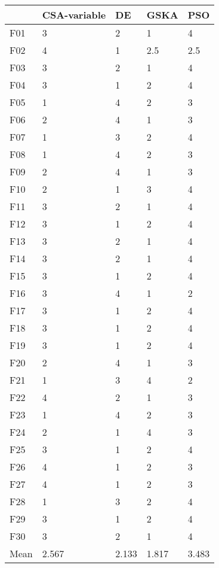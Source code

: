 \begin{tabular}{lllll}
\toprule
{} & CSA-variable &     DE &   GSKA &    PSO \\
\midrule
F01  &            3 &      2 &      1 &      4 \\
F02  &            4 &      1 &    2.5 &    2.5 \\
F03  &            3 &      2 &      1 &      4 \\
F04  &            3 &      1 &      2 &      4 \\
F05  &            1 &      4 &      2 &      3 \\
F06  &            2 &      4 &      1 &      3 \\
F07  &            1 &      3 &      2 &      4 \\
F08  &            1 &      4 &      2 &      3 \\
F09  &            2 &      4 &      1 &      3 \\
F10  &            2 &      1 &      3 &      4 \\
F11  &            3 &      2 &      1 &      4 \\
F12  &            3 &      1 &      2 &      4 \\
F13  &            3 &      2 &      1 &      4 \\
F14  &            3 &      2 &      1 &      4 \\
F15  &            3 &      1 &      2 &      4 \\
F16  &            3 &      4 &      1 &      2 \\
F17  &            3 &      1 &      2 &      4 \\
F18  &            3 &      1 &      2 &      4 \\
F19  &            3 &      1 &      2 &      4 \\
F20  &            2 &      4 &      1 &      3 \\
F21  &            1 &      3 &      4 &      2 \\
F22  &            4 &      2 &      1 &      3 \\
F23  &            1 &      4 &      2 &      3 \\
F24  &            2 &      1 &      4 &      3 \\
F25  &            3 &      1 &      2 &      4 \\
F26  &            4 &      1 &      2 &      3 \\
F27  &            4 &      1 &      2 &      3 \\
F28  &            1 &      3 &      2 &      4 \\
F29  &            3 &      1 &      2 &      4 \\
F30  &            3 &      2 &      1 &      4 \\
Mean &        2.567 &  2.133 &  1.817 &  3.483 \\
\bottomrule
\end{tabular}
